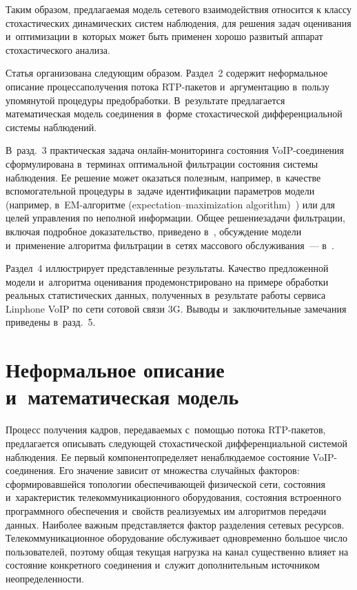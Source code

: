 \begin{multicols}{2}
Таким образом, предлагаемая модель сетевого взаимодействия относится
к классу стохастических динамических систем наблюдения, для решения
задач оценивания и~оптимизации в~которых может быть применен хорошо
развитый аппарат стохастического анализа.

Статья организована следующим образом. Раздел~2
содержит неформальное описание процесса\linebreak получения потока RTP-па\-ке\-тов
и~аргументацию в~пользу упомянутой процедуры предобработки. 
В~результате предлагается  математическая модель соединения  в~форме
стохастической дифференциальной системы наблюдений. 

В~разд.~3 практическая задача он\-лайн-мо\-ни\-то\-рин\-га
состояния VoIP-со\-еди\-не\-ния сформулирована в~терминах оптимальной
фильтрации состояния системы наблюдения. Ее решение может оказаться
полезным, например, в~качестве вспомогательной процедуры в~задаче
идентификации параметров модели (например, в~EM-ал\-го\-рит\-ме
(expectation--maximization algorithm)~\cite{EAM_94}) 
или для целей управ\-ле\-ния по неполной информации.
Общее решение\linebreak задачи фильтрации, включая подробное доказательство,
приведено в~\cite{B_14}, обсуждение модели и~применение алгоритма
фильтрации в~сетях массового обслуживания~--- в~\cite{B_15}.

Раздел~4 иллюстрирует представленные результаты.
Качество предложенной модели и~алгоритма оценивания
продемонстрировано на примере обработки реальных статистических
данных, полученных в~результате работы сервиса Linphone VoIP по сети
сотовой связи 3G. Выводы и~заключительные замечания приведены в~разд.~5.

\section{Неформальное описание и~математическая модель} %

Процесс получения кадров, передаваемых с~помощью потока RTP-па\-ке\-тов,
предлагается описывать следующей стохастической дифференциальной
системой наблюдения. Ее первый компонент\linebreak определяет ненаблюдаемое
состояние VoIP-со\-едине\-ния. Его значение зависит от множества
случай\-ных факторов: сформировавшейся топологии обеспечива\-ющей
физической сети, состояния и~характеристик телекоммуникационного
оборудования, состояния встроенного программного обеспечения 
и~свойств реализуемых им алгоритмов передачи данных. Наиболее важным
представляется фактор разделения сетевых ресурсов.
Телекоммуникационное оборудование обслуживает одновременно большое
число пользователей, поэтому общая текущая нагрузка на канал
существенно влияет на состояние конкретного соединения и~служит
дополнительным источником неопределенности.


\end{multicols}
